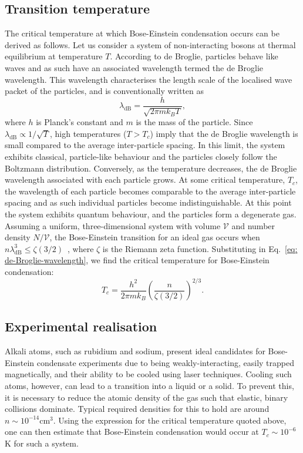 \subsection{Transition temperature}
The critical temperature at which Bose-Einstein condensation occurs can be
derived as follows.
Let us consider a system of non-interacting bosons at thermal equilibrium at
temperature \(T\).
According to de Broglie, particles behave like waves and as such have an
associated wavelength termed the de Broglie wavelength.
This wavelength characterises the length scale of the localised wave packet of
the particles, and is conventionally written as
\begin{equation}\label{eq: de-Broglie-wavelength}
    \lambda_\text{dB} = \frac{h}{\sqrt{2\pi mk_B T}},
\end{equation}
where \(h\) is Planck's constant and \(m\) is the mass of the particle.
Since \(\lambda_\text{dB} \propto 1 / \sqrt{T}\), high temperatures
(\(T > T_c\)) imply that the de Broglie wavelength is small compared to the
average inter-particle spacing.
In this limit, the system exhibits classical, particle-like behaviour and the
particles closely follow the Boltzmann distribution.
Conversely, as the temperature decreases, the de Broglie wavelength associated
with each particle grows.
At some critical temperature, \(T_c\), the wavelength of each particle becomes
comparable to the average inter-particle spacing and as such individual
particles become indistinguishable.
At this point the system exhibits quantum behaviour, and the particles form a
degenerate gas.
Assuming a uniform, three-dimensional system with volume \(\mathcal{V}\) and
number density \(N/\mathcal{V}\), the Bose-Einstein transition for an ideal
gas occurs when \(n\lambda_{\text{dB}}^3 \leq \zeta(3/2)\)~\cite{Pethick2008},
where \(\zeta \) is the Riemann zeta function.
Substituting in Eq.~\eqref{eq: de-Broglie-wavelength}, we find the critical
temperature for Bose-Einstein condensation:
\begin{equation}
    T_c = \frac{h^2}{2\pi mk_B}{\left(\frac{n}{\zeta(3/2)}\right)}^{2/3}.
\end{equation}

\subsection{Experimental realisation}
Alkali atoms, such as rubidium and sodium, present ideal candidates
for Bose-Einstein condensate experiments due to being weakly-interacting, easily
trapped magnetically, and their ability to be cooled using laser techniques.
Cooling such atoms, however, can lead to a transition into a liquid or a solid.
To prevent this, it is necessary to reduce the atomic density of the gas such
that elastic, binary collisions dominate.
Typical required densities for this to hold are around \(n \sim 10^{-14}
\text{cm}^3\).
Using the expression for the critical temperature quoted above, one can then
estimate that Bose-Einstein condensation would occur at \(T_c \sim 10^{-6}\)K
for such a system.

